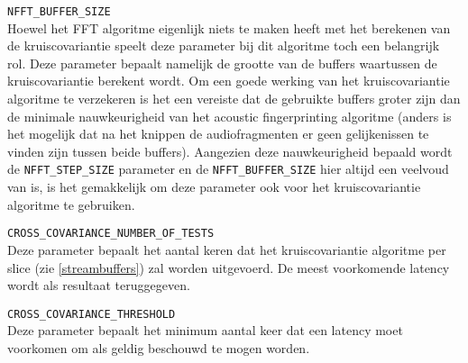 \begin{description}	
	\item\texttt{NFFT\_BUFFER\_SIZE} \hfill \\
	Hoewel het FFT algoritme eigenlijk niets te maken heeft met het berekenen van de kruiscovariantie speelt deze parameter bij dit algoritme toch een belangrijk rol. Deze parameter bepaalt namelijk de grootte van de buffers waartussen de kruiscovariantie berekent wordt. Om een goede werking van het kruiscovariantie algoritme te verzekeren is het een vereiste dat de gebruikte buffers groter zijn dan de minimale nauwkeurigheid van het acoustic fingerprinting algoritme (anders is het mogelijk dat na het knippen de audiofragmenten er geen gelijkenissen te vinden zijn tussen beide buffers). Aangezien deze nauwkeurigheid bepaald wordt de \texttt{NFFT\_STEP\_SIZE} parameter en de \texttt{NFFT\_BUFFER\_SIZE} hier altijd een veelvoud van is, is het gemakkelijk om deze parameter ook voor het kruiscovariantie algoritme te gebruiken.
	
	\item\texttt{CROSS\_COVARIANCE\_NUMBER\_OF\_TESTS} \hfill \\
	Deze parameter bepaalt het aantal keren dat het kruiscovariantie algoritme per slice (zie \ref{streambuffers}) zal worden uitgevoerd. De meest voorkomende latency wordt als resultaat teruggegeven.
	
	\item\texttt{CROSS\_COVARIANCE\_THRESHOLD} \hfill \\
	Deze parameter bepaalt het minimum aantal keer dat een latency moet voorkomen om als geldig beschouwd te mogen worden.
	
\end{description}


